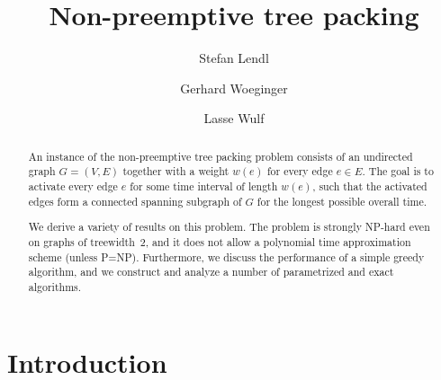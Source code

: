 \documentclass[runningheads]{llncs}
\begin{document}
\title{Non-preemptive tree packing}

\author{Stefan Lendl \and
Gerhard Woeginger \and
Lasse Wulf}

%
\maketitle 

\begin{abstract}
An instance of the non-preemptive tree packing problem consists of an undirected graph $G=(V,E)$ 
together with a weight $w(e)$ for every edge $e\in E$.
The goal is to activate every edge $e$ for some time interval of length $w(e)$, such that the 
activated edges form a connected spanning subgraph of $G$ for the longest possible overall time.

We derive a variety of results on this problem.
The problem is strongly NP-hard even on graphs of treewidth~$2$, and it does not allow a polynomial
time approximation scheme (unless P=NP).
Furthermore, we discuss the performance of a simple greedy algorithm, and we construct and analyze
a number of parametrized and exact algorithms.
\end{abstract}


\section{Introduction}
\end{document}
